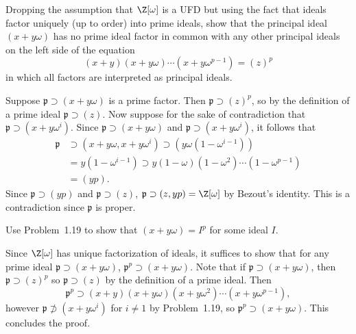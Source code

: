 \documentclass[11pt,letterpaper]{article}
\begin{document}
\begin{cproblem}{1.19}
  Dropping the assumption that $\Z[\omega]$ is a UFD but using the fact that ideals factor uniquely (up to order) into prime ideals, show that the principal ideal $(x+y\omega)$ has no prime ideal factor in common with any other principal ideals on the left side of the equation
  \[
    (x+y)(x+y\omega)\cdots(x+y\omega^{p-1}) = (z)^p
  \]
  in which all factors are interpreted as principal ideals. 
\end{cproblem}

\begin{solution}
   Suppose $\mathfrak{p} \supset (x+y\omega)$ is a prime factor. Then $\mathfrak{p} \supset (z)^p$, so by the definition of a prime ideal $\mathfrak{p} \supset (z)$. Now suppose for the sake of contradiction that $\mathfrak{p}\supset (x+y\omega^i)$. Since $\mathfrak{p} \supset (x+y\omega)$ and $\mathfrak{p} \supset (x+y\omega^i)$, it follows that 
   \[
       \begin{aligned}
        \mathfrak{p} &\supset (x+y\omega, x+y\omega^i) \supset (y\omega(1-\omega^{i-1}))\\&=y(1-\omega^{i-1})\supset y(1-\omega)(1-\omega^2)\cdots(1-\omega^{p-1})\\&=(yp).
       \end{aligned}
    \] 
    Since $\mathfrak{p} \supset (yp)$ and $\mathfrak{p} \supset (z)$, $\mathfrak{p} \supset (z,yp) = \Z[\omega]$ by Bezout's identity. This is a contradiction since $\mathfrak{p}$ is proper.      
\end{solution}

\pagebreak
\begin{cproblem}{1.20}
   Use Problem~1.19 to show that $(x+y\omega)=I^p$ for some ideal $I$.   
\end{cproblem}

\begin{solution}
   Since $\Z[\omega]$ has unique factorization of ideals, it suffices to show that for any prime ideal $\mathfrak{p} \supset (x+y\omega)$, $\mathfrak{p}^p\supset (x+y\omega)$. Note that if $\mathfrak{p} \supset (x+y\omega)$, then $\mathfrak{p} \supset (z)^p$ so $\mathfrak{p} \supset (z)$ by the definition of a prime ideal. Then 
   \[
       \mathfrak{p}^p \supset (x+y)(x+y\omega)(x+y\omega^2)\cdots(x+y\omega^{p-1})
   ,\]
   however $\mathfrak{p} \not\supset (x+y\omega^i)$ for $i\neq 1$ by Problem~1.19, so $\mathfrak{p}^p\supset (x+y\omega)$. This concludes the proof.          
\end{solution}
\end{document}
